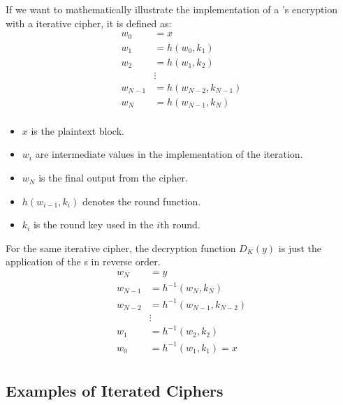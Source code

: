 If we want to mathematically illustrate the implementation of a 's encryption with a iterative cipher, it is defined as:
\begin{align*}
  w_{0} &= x \\
  w_{1} &= h(w_{0}, k_{1}) \\
  w_{2} &= h(w_{1}, k_{2}) \\
        &\vdots \\
  w_{N-1} &= h(w_{N-2}, k_{N-1}) \\
  w_{N} &= h(w_{N-1}, k_{N}) \\
\end{align*}
\begin{itemize}[noitemsep]
\item $x$ is the plaintext block.
\item $w_{i}$ are intermediate values in the implementation of the iteration.
\item $w_{N}$ is the final output from the cipher.
\item $h(w_{i-1}, k_{i})$ denotes the round function.
\item $k_{i}$ is the round key used in the $i$th round.
\end{itemize}

For the same iterative cipher, the decryption function $D_{K}(y)$ is just the application of the s in reverse order.
\begin{align*}
  w_{N} &= y \\
  w_{N-1} &= h^{-1}(w_{N}, k_{N}) \\
  w_{N-2} &= h^{-1}(w_{N-1}, k_{N-2}) \\
        &\vdots \\
  w_{1} &= h^{-1}(w_{2}, k_{2}) \\
  w_{0} &= h^{-1}(w_{1}, k_{1}) = x \\
\end{align*}

\subsection{Examples of Iterated Ciphers}\label{subsec:Examples_Iterated_Ciphers}
